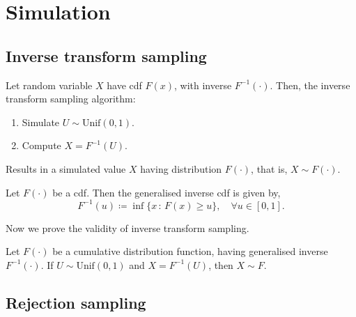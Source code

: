 \documentclass[10pt, a4paper]{article}
\begin{document}
\newpage

\section{Simulation}

\subsection{Inverse transform sampling}
\begin{definition}
    Let random variable $X$ have cdf $F(x)$,
    with inverse $F ^ {-1}(\cdot)$.
    Then,
    the inverse transform sampling algorithm:
    \begin{enumerate}[label = (\arabic*)]
        \item Simulate $U \sim \mathrm{Unif}(0, 1)$.

        \item Compute $X = F ^ {-1}(U)$.
    \end{enumerate}
    Results in a simulated value $X$ having distribution $F(\cdot)$,
    that is,
    $X \sim F(\cdot)$.
\end{definition}

\begin{definition}
    Let $F(\cdot)$ be a cdf.
    Then the generalised inverse cdf is given by,
    \[
    F ^ {-1}(u) \coloneqq \inf\{x\,:\,F(x) \geq u\},\quad \forall u \in [0, 1].
    \]
\end{definition}
Now we prove the validity of inverse transform sampling.

\begin{theorem}
    Let $F(\cdot)$ be a cumulative distribution function,
    having generalised inverse $F ^ {-1}(\cdot)$.
    If $U \sim \mathrm{Unif}(0, 1)$ and $X = F ^ {-1}(U)$,
    then $X \sim F$.
\end{theorem}

\subsection{Rejection sampling}
\end{document}
